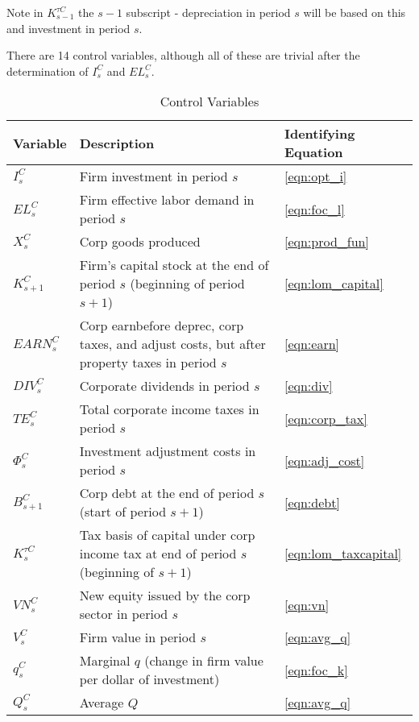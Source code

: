 \documentclass[article,11pt,letterpaper,fleqn]{article}
\theoremstyle{definition}
\numberwithin{equation}{section}
\begin{document}
Note in $K^{\tau C}_{s-1}$ the $s-1$ subscript - depreciation in period $s$ will be based on this and investment in period $s$.

There are 14 control variables, although all of these are trivial after the determination of $I^{C}_{s}$ and $EL^{C}_{s}$.

\begin{table}[htbp]
  \centering
  \caption{Control Variables}
    \begin{tabular}{lll}
    \hline
    \hline
    Variable & Description & Identifying Equation \\
    \hline
    $I^{C}_{s}$ & Firm investment in period $s$ & \ref{eqn:opt_i} \\
    $EL^{C}_{s}$ & Firm effective labor demand in period $s$ & \ref{eqn:foc_l} \\
    $X^{C}_{s}$ & Corp goods produced & \ref{eqn:prod_fun} \\
    $K^{C}_{s+1}$ & Firm's capital stock at the end of period $s$ (beginning of period $s+1$) & \ref{eqn:lom_capital} \\
    $EARN^{C}_{s}$ & Corp earnbefore deprec, corp taxes, and adjust costs, but after property taxes in period $s$ & \ref{eqn:earn} \\
    $DIV^{C}_{s}$ & Corporate dividends in period $s$ & \ref{eqn:div} \\
    $TE^{C}_{s}$ & Total corporate income taxes in period $s$ & \ref{eqn:corp_tax} \\
    $\Phi^{C}_{s}$ & Investment adjustment costs in period $s$ & \ref{eqn:adj_cost} \\
    $B^{C}_{s+1}$ & Corp debt at the end of period $s$ (start of period $s+1$) & \ref{eqn:debt} \\
    $K^{\tau C}_{s}$ & Tax basis of capital under corp income tax at end of period $s$ (beginning of $s+1$) & \ref{eqn:lom_taxcapital} \\
    $VN^{C}_{s}$ & New equity issued by the corp sector in period $s$ & \ref{eqn:vn} \\
    $V^{C}_{s}$ & Firm value in period $s$ & \ref{eqn:avg_q} \\
    $q^{C}_{s}$ & Marginal $q$ (change in firm value per dollar of investment) & \ref{eqn:foc_k} \\
    $Q^{C}_{s}$ & Average $Q$ & \ref{eqn:avg_q} \\
    \hline
    \hline
    \end{tabular}%
  \label{tab:control_vars}%
\end{table}%
\end{document}
